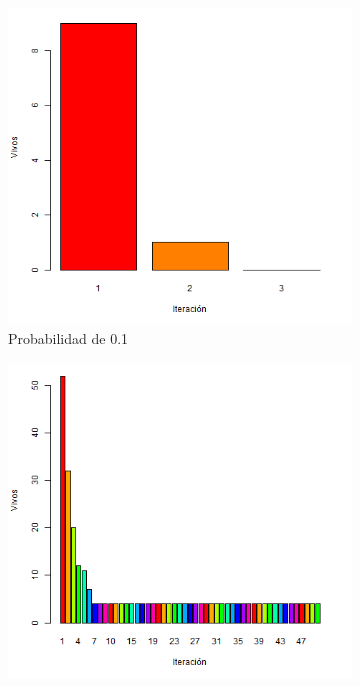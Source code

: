 \documentclass{article}
\begin{document}
\begin{figure}
\centering
\begin{subfigure}[b]{0.4\linewidth}
\includegraphics[width=\linewidth]{prob0-1.png}
\caption{Probabilidad de 0.1}
\label{prob1}
\end{subfigure}
\begin{subfigure}[b]{0.4\linewidth}
\includegraphics[width=\linewidth]{prob0-2.png}

\end{subfigure}
\end{figure}
\end{document}
